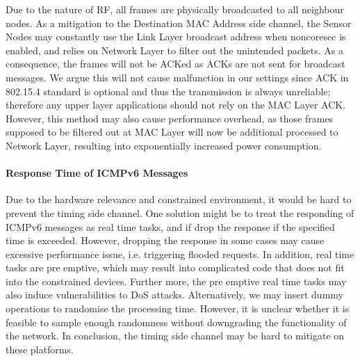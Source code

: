 Due to the nature of RF, all frames are physically broadcasted to all neighbour nodes. As a mitigation to the Destination MAC Address side channel, the Sensor Nodes may constantly use the Link Layer broadcast address when noncoresec is enabled, and relies on Network Layer to filter out the unintended packets. As a consequence, the frames will not be ACKed as ACKs are not sent for broadcast messages. We argue this will not cause malfunction in our settings since ACK in 802.15.4 standard is optional and thus the transmission is always unreliable; therefore any upper layer applications should not rely on  the MAC Layer ACK. However, this method may also cause performance overhead, as those frames supposed to be filtered out at MAC Layer will now be additional processed to Network Layer, resulting into exponentially increased power consumption.

\paragraph{Response Time of ICMPv6 Messages}

Due to the hardware relevance and constrained environment, it would be hard to prevent the timing side channel. One solution might be to treat the responding of ICMPv6 messages as real time tasks, and if drop the response if the specified time is exceeded. However, dropping the response in some cases may cause excessive performance issue, i.e. triggering flooded requests. In addition, real time tasks are pre emptive, which may result into complicated code that does not fit into the constrained devices. Further more, the pre emptive real time tasks may also induce vulnerabilities to DoS attacks. Alternatively, we may insert dummy operations to randomise the processing time. However, it is unclear whether it is feasible to sample enough randomness without downgrading the functionality of the network. In conclusion, the timing side channel may be hard to mitigate on these platforms.





